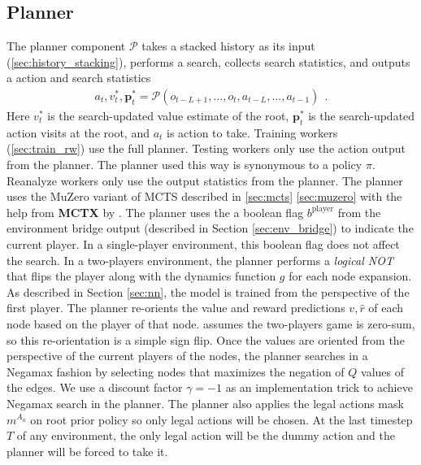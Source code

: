 \subsection{Planner} \label{sec:planner}
The planner component $\mathcal{P}$ takes a stacked history as its input (\ref{sec:history_stacking}), performs a search, collects search statistics, and outputs a action and search statistics
\begin{align*}
    a_t, v^*_t, \mathbf{p}^*_t = \mathcal{P}(o_{t - L + 1}, \dots, o_t, a_{t - L}, \dots, a_{t - 1}) ~~ .
\end{align*}
Here $v^*_t$ is the search-updated value estimate of the root, $\mathbf{p}^*_t$ is the search-updated action visits at the root, and $a_t$ is action to take.
Training workers (\ref{sec:train_rw}) use the full planner.
Testing workers only use the action output from the planner.
The planner used this way is synonymous to a policy $\pi$.
Reanalyze workers only use the output statistics from the planner.
The planner uses the MuZero variant of MCTS described in \ref{sec:mcts} \ref{sec:muzero} with the help from \textbf{MCTX} by \citeauthor{MctxMCTSinJAX_IvoDanihelka_2022} \cite{MctxMCTSinJAX_IvoDanihelka_2022,JAXComposableTransformations_JamesBradbury.RoyFrostig.ea_2018,PolicyImprovementPlanning_Danihelka.Guez.ea_2022}.
The planner uses the a boolean flag $b^{\text{player}}$ from the environment bridge output (described in Section \ref{sec:env_bridge}) to indicate the current player.
In a single-player environment, this boolean flag does not affect the search.
In a two-players environment, the planner performs a \textit{logical NOT} that flips the player along with the dynamics function \(g\) for each node expansion.
As described in Section \ref{sec:nn}, the model is trained from the perspective of the first player.
The planner re-orients the value and reward predictions $v, \hat{r}$ of each node based on the player of that node.
\moozi assumes the two-players game is zero-sum, so this re-orientation is a simple sign flip.
Once the values are oriented from the perspective of the current players of the nodes, the planner searches in a Negamax fashion by selecting nodes that maximizes the negation of $Q$ values of the edges.
We use a discount factor $\gamma = -1$ as an implementation trick to achieve Negamax search in the planner. 
The planner also applies the legal actions mask $m^{A_a}$ on root prior policy so only legal actions will be chosen.
At the last timestep $T$ of any environment, the only legal action will be the dummy action and the planner will be forced to take it.

